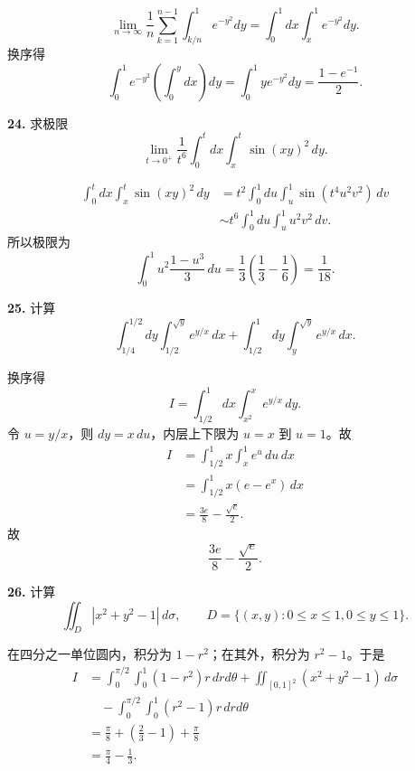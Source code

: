 \begin{solutionblock}
\[
\lim_{n\to\infty}\frac1n\sum_{k=1}^{n-1}\int_{k/n}^1e^{-y^2}dy
=\int_0^1dx\int_x^1e^{-y^2}dy.
\]
换序得
\[
\int_0^1e^{-y^2}\left(\int_0^y dx\right)dy
=\int_0^1y e^{-y^2}dy
=\boxed{\frac{1-e^{-1}}2}.
\]
\end{solutionblock}

\begin{problemblock}
\textbf{24.} 求极限
\[
\lim_{t\to0^+}\frac1{t^6}\int_0^t dx\int_x^t\sin (xy)^2\,dy.
\]
\end{problemblock}

\begin{solutionblock}
\[
\begin{aligned}
\int_0^t dx\int_x^t\sin (xy)^2\,dy
&=t^2\int_0^1du\int_u^1\sin(t^4u^2v^2)\,dv\\
&\sim t^6\int_0^1du\int_u^1u^2v^2\,dv.
\end{aligned}
\]
所以极限为
\[
\int_0^1u^2\frac{1-u^3}{3}\,du
=\frac13\left(\frac13-\frac16\right)
=\boxed{\frac1{18}}.
\]
\end{solutionblock}

\begin{problemblock}
\textbf{25.} 计算
\[
\int_{1/4}^{1/2}dy\int_{1/2}^{\sqrt y}e^{y/x}\,dx
+\int_{1/2}^{1}dy\int_y^{\sqrt y}e^{y/x}\,dx.
\]
\end{problemblock}

\begin{solutionblock}
换序得
\[
I=\int_{1/2}^1dx\int_{x^2}^{x}e^{y/x}\,dy.
\]
令 \(u=y/x\)，则 \(dy=x\,du\)，内层上下限为 \(u=x\) 到 \(u=1\)。故
\[
\begin{aligned}
I&=\int_{1/2}^1x\int_x^1e^u\,du\,dx\\
&=\int_{1/2}^1x(e-e^x)\,dx\\
&=\frac{3e}{8}-\frac{\sqrt e}{2}.
\end{aligned}
\]
故
\[
\boxed{\frac{3e}{8}-\frac{\sqrt e}{2}}.
\]
\end{solutionblock}

\begin{problemblock}
\textbf{26.} 计算
\[
\iint_D|x^2+y^2-1|\,d\sigma,\qquad
D=\{(x,y):0\le x\le1,0\le y\le1\}.
\]
\end{problemblock}

\begin{solutionblock}
在四分之一单位圆内，积分为 \(1-r^2\)；在其外，积分为 \(r^2-1\)。于是
\[
\begin{aligned}
I&=\int_0^{\pi/2}\int_0^1(1-r^2)r\,drd\theta
+\iint_{[0,1]^2}(x^2+y^2-1)\,d\sigma\\
&\quad-\int_0^{\pi/2}\int_0^1(r^2-1)r\,drd\theta\\
&=\frac{\pi}{8}+\left(\frac23-1\right)+\frac{\pi}{8}\\
&=\boxed{\frac{\pi}{4}-\frac13}.
\end{aligned}
\]
\end{solutionblock}

